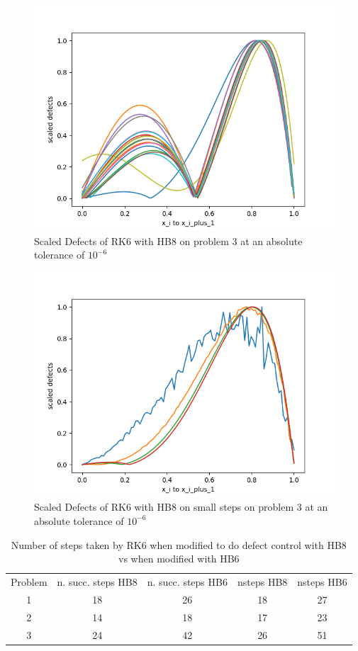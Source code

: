 \documentclass{article}
\begin{document}
\begin{figure}[H]
\centering
\includegraphics[width=0.7\linewidth]{./figures/rk6_with_hb8_p3_scaled_defects}
\caption{Scaled Defects of RK6 with HB8 on problem 3 at an absolute tolerance of $10^{-6}$}
\label{fig:rk6_with_hb8_p3_scaled_defects}
\end{figure}

\begin{figure}[H]
\centering
\includegraphics[width=0.7\linewidth]{./figures/rk6_with_hb8_p3_scaled_defects_small_steps}
\caption{Scaled Defects of RK6 with HB8 on small steps on problem 3 at an absolute tolerance of $10^{-6}$}
\label{fig:rk6_with_hb8_p3_scaled_defects_small_steps}
\end{figure}

\begin{table}[h]
\caption {Number of steps taken by RK6 when modified to do defect control with HB8 vs when modified with HB6} \label{tab:rk6_with_hb6_vs_hb8_nsteps}
\begin{center}
\begin{tabular}{ c c c c c } 
Problem & n. succ. steps HB8 & n. succ. steps HB6 & nsteps HB8 & nsteps HB6 \\ 
1       & 18                 &        26          & 18         & 27\\ 
2       & 14                 &        18          & 17         & 23\\
3       & 24                 &        42          & 26         & 51\\
\end{tabular}
\end{center}
\end{table}
\end{document}
